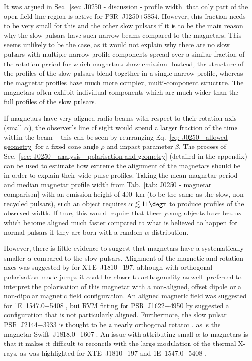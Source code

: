 It was argued in Sec.~\ref{sec: J0250 - discussion - profile width} that only part of the open-field-line region is active for PSR~J0250+5854. However, this fraction needs to be very small for this and the other slow pulsars if it is to be the main reason why the slow pulsars have such narrow beams compared to the magnetars. This seems unlikely to be the case, as it would not explain why there are no slow pulsars with multiple narrow profile components spread over a similar fraction of the rotation period for which magnetars show emission. Instead, the structure of the profiles of the slow pulsars blend together in a single narrow profile, whereas the magnetar profiles have much more complex, multi-component structure. The magnetars often exhibit individual components which are much wider than the full profiles of the slow pulsars.





If magnetars have very aligned radio beams with respect to their rotation axis (small $\alpha$), the observer's line of sight would spend a larger fraction of the time within the beam -- this can be seen by rearranging Eq.~\eqref{eq: J0250 - allowed geometry} for a fixed cone angle $\rho$ and impact parameter $\beta$. The process of Sec.~\ref{sec: J0250 - analysis - polarisation and geometry} (detailed in the appendix) can be used to estimate how extreme the alignment of the magnetars should be in order to explain their wide pulse profiles. Taking the mean magnetar period and median magnetar profile width from Tab.~\ref{tab: J0250 - magnetar comparison} with an emission height of 400~km (to be the same as the slow, non-recycled pulsars), such an object requires $\alpha\lesssim 11\degr$ to produce profiles of the observed width. If true, this would require that these young objects have beams which become aligned much faster compared to what is believed to happen for normal pulsars \citep{TMxx1998,WJxx2008} if they are born with a random $\alpha$ distribution.


However, there is little evidence to suggest that magnetars have a systematically smaller $\alpha$ compared to the slow pulsars. Alignment of the magnetic and rotation axes was suggested by \citet{CCR+2007} for XTE~J1810$-$197, although with orthogonal polarisation mode jumps it could be closer to orthogonality as well. \citet{KSJ+2007} preferred to interpret the polarisation of this magnetar with a non-aligned, offset dipole or a non-dipolar magnetic field configuration. An aligned magnetic field was suggested for 1E~1547.0$-$5408 \citep{CRJ+2008}, but RVM fitting for PSR~J1622$-$4950 by \citet{LBB+2012} suggested a configuration that is not particularly aligned. Furthermore, the slow pulsar PSR~J2144$-$3933 is thought to be a nearly orthogonal rotator \citep{MBMA2020}, as is the magnetar Swift~J1818.0$-$1607 \citep{LJS+2021}. An issue with attributing small $\alpha$ to magnetars is that it makes it difficult to reconcile with the large modulation of the thermal X-rays, as was highlighted for XTE~J1810$-$197 \citep{GHxx2007,PGxx2008} and 1E~1547.0$-$5408 \citep{IER+2010}.

